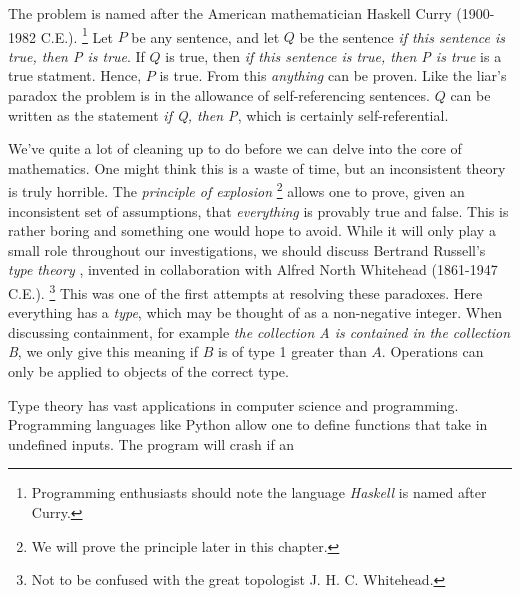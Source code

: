         The problem is named after the American mathematician
        Haskell Curry (1900-1982 C.E.).%
        \footnote{%
            Programming enthusiasts should note the language
            \textit{Haskell} is named after Curry.
        }
        Let $P$ be any sentence, and let $Q$ be the sentence
        \textit{if this sentence is true, then P is true}. If $Q$ is true, then
        \textit{if this sentence is true, then P is true} is a true statment.
        Hence, $P$ is true. From this \textit{anything} can be proven. Like the
        liar's paradox the problem is in the allowance of self-referencing
        sentences. $Q$ can be written as the statement \textit{if Q, then P},
        which is certainly self-referential.
        \par\hfill\par
        We've quite a lot of cleaning up to do before we can delve into the core
        of mathematics. One might think this is a waste of time, but an
        inconsistent theory is truly horrible. The
        \textit{principle of explosion}%
        \footnote{We will prove the principle later in this chapter.}
        allows one to prove, given an inconsistent set of assumptions, that
        \textit{everything} is provably true and false. This is rather boring
        and something one would hope to avoid. While it will only play a small
        role throughout our investigations, we should discuss Bertrand
        Russell's \textit{type theory}%
        , invented in collaboration with
        Alfred North Whitehead
        (1861-1947 C.E.).%
        \footnote{%
            Not to be confused with the great topologist J. H. C. Whitehead.
        }
        This was one of the first attempts at resolving these paradoxes. Here
        everything has a \textit{type}, which may be thought of as a
        non-negative integer. When discussing containment, for example
        \textit{the collection A is contained in the collection B}, we only
        give this meaning if $B$ is of type 1 greater than $A$. Operations can
        only be applied to objects of the correct type.
        \par\hfill\par
        Type theory has vast applications in computer science and programming.
        Programming languages like Python allow one to define
        functions that take in undefined inputs. The program will crash if an
